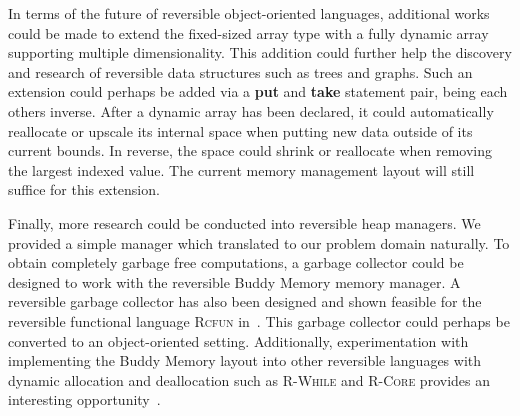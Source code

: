 In terms of the future of reversible object-oriented languages, additional works could be made to extend the fixed-sized array type with a fully dynamic array supporting multiple dimensionality. This addition could further help the discovery and research of reversible data structures such as trees and graphs. Such an extension could perhaps be added via a \textbf{put} and \textbf{take} statement pair, being each others inverse. After a dynamic array has been declared, it could automatically reallocate or upscale its internal space when putting new data outside of its current bounds. In reverse, the space could shrink or reallocate when removing the largest indexed value. The current memory management layout will still suffice for this extension.

Finally, more research could be conducted into reversible heap managers. We provided a simple manager which translated to our problem domain naturally. To obtain completely garbage free computations, a garbage collector could be designed to work with the reversible Buddy Memory memory manager. A reversible garbage collector has also been designed and shown feasible for the reversible functional language \textsc{Rcfun} in~\cite{tm:garbage}. This garbage collector could perhaps be converted to an object-oriented setting. Additionally, experimentation with implementing the Buddy Memory layout into other reversible languages with dynamic allocation and deallocation such as \textsc{R-While} and \textsc{R-Core} provides an interesting opportunity~\cite{rg:rwhile, rg:rcore}.
